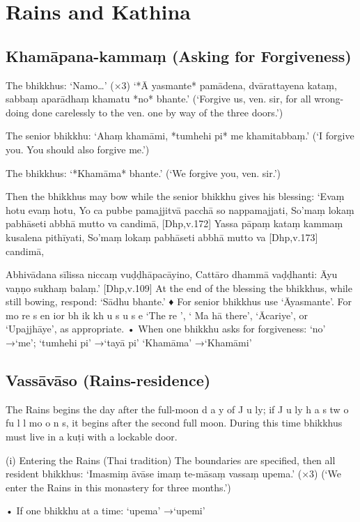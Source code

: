 \chapter{Rains and Kathina}

\section{Khamāpana-kammaṃ (Asking for Forgiveness)}

The bhikkhus: ‘Namo…’ (×3)
‘*Ā yasmante* pamādena,
dvārattayena kataṃ,
sabbaṃ aparādhaṃ khamatu *no* bhante.’
(‘Forgive us, ven. sir, for all wrong-doing done
carelessly to the ven. one by way of the three doors.’)

The senior bhikkhu:
‘Ahaṃ khamāmi,
*tumhehi pi* me khamitabbaṃ.’
(‘I forgive you. You should also forgive me.’)

The bhikkhus: ‘*Khamāma* bhante.’
(‘We forgive you, ven. sir.’)

Then the bhikkhus may bow while the senior
bhikkhu gives his blessing:
‘Evaṃ hotu evaṃ hotu,
Yo ca pubbe pamajjitvā pacchā so nappamajjati,
So’maṃ lokaṃ pabhāseti abbhā mutto va
candimā,
[Dhp,v.172]
Yassa pāpaṃ kataṃ kammaṃ kusalena pithīyati,
So’maṃ lokaṃ pabhāseti abbhā mutto va
[Dhp,v.173]
candimā,

Abhivādana sīlissa niccaṃ vuḍḍhāpacāyino,
Cattāro dhammā vaḍḍhanti:
Āyu vaṇṇo sukhaṃ balaṃ.’ [Dhp,v.109]
At the end of the blessing the bhikkhus, while
still bowing, respond: ‘Sādhu bhante.’
♦ For senior bhikkhus use ‘Āyasmante’. For
mo re s en ior bh ik kh u s u s e ‘The re ’, ‘ Ma hā there’, ‘Ācariye’, or ‘Upajjhāye’, as appropriate.
• When one bhikkhu asks for forgiveness:
‘no’ →‘me’; ‘tumhehi pi’ →‘tayā pi’
‘Khamāma’ →‘Khamāmi’

\section{Vassāvāso (Rains-residence)}

The Rains begins the day after the full-moon
d a y of J u ly; if J u ly h a s tw o fu l l mo o n s, it
begins after the second full moon. During this
time bhikkhus must live in a kuṭi with a lockable door.

(i) Entering the Rains (Thai tradition)
The boundaries are specified, then all resident
bhikkhus:
‘Imasmiṃ āvāse
imaṃ te-māsaṃ vassaṃ upema.’ (×3)
(‘We enter the Rains in this monastery
for three months.’)

• If one bhikkhu at a time: ‘upema’ →‘upemi’

